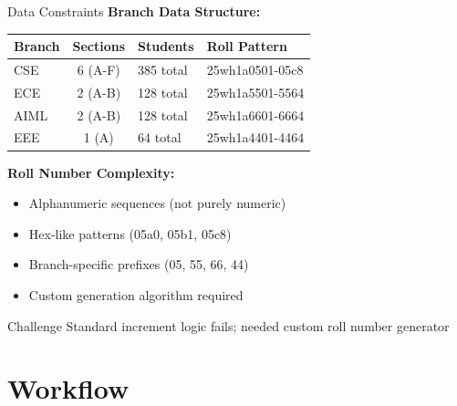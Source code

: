 \documentclass[aspectratio=169]{beamer}
\begin{document}
\begin{frame}{Data Constraints}
\textbf{Branch Data Structure:}

\begin{table}
\centering
\tiny
\begin{tabular}{|l|c|l|l|}
\hline
\textbf{Branch} & \textbf{Sections} & \textbf{Students} & \textbf{Roll Pattern} \\
\hline
CSE & 6 (A-F) & 385 total & 25wh1a0501-05c8 \\
ECE & 2 (A-B) & 128 total & 25wh1a5501-5564 \\
AIML & 2 (A-B) & 128 total & 25wh1a6601-6664 \\
EEE & 1 (A) & 64 total & 25wh1a4401-4464 \\
\hline
\end{tabular}
\end{table}

\vspace{0.3cm}
\textbf{Roll Number Complexity:}
\begin{itemize}
    \item Alphanumeric sequences (not purely numeric)
    \item Hex-like patterns (05a0, 05b1, 05c8)
    \item Branch-specific prefixes (05, 55, 66, 44)
    \item Custom generation algorithm required
\end{itemize}

\vspace{0.3cm}
\begin{alertblock}{Challenge}
Standard increment logic fails; needed custom roll number generator
\end{alertblock}
\end{frame}

\section{Workflow}
\end{document}
